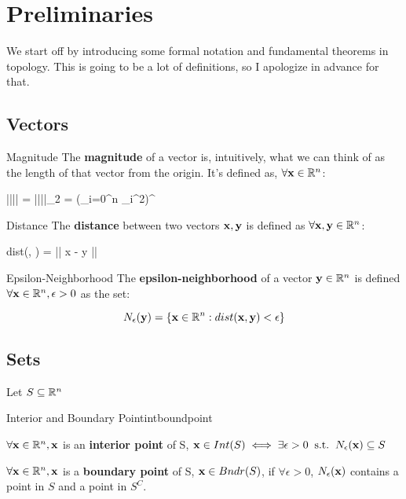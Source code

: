 
% 
% 

\pagebreak
\section{Preliminaries}

We start off by introducing some formal notation and fundamental theorems in topology.
This is going to be a lot of definitions, so I apologize in advance for that.

\subsection{Vectors}

\begin{defn}{Magnitude}{}
	The \textbf{magnitude} of a vector is, intuitively, what we can think of as the length
	of that vector from the origin. It's defined as, $\forall \mathbf{x} \in \mathbb{R}^n$:
\begin{frml}
	||\vx|| = ||\vx||_2 = (\sum_{i=0}^{n} \vx_i^2)^{}
\end{frml}
\end{defn}

\begin{defn}{Distance}{}
	The \textbf{distance} between two vectors $\mathbf{x}, \mathbf{y}$ is defined as $\forall \mathbf{x}, \mathbf{y} \in \mathbb{R}^n$:
	\begin{frml}
		dist(\vx, \vy) = || x - y ||
	\end{frml}
\end{defn}

\begin{defn}{Epsilon-Neighborhood}{}
The \textbf{epsilon-neighborhood} of a vector $\mathbf{y}\in\mathbb{R}^n$ is defined $\forall \mathbf{x}\in\mathbb{R}^n,
\epsilon>0$ as the set: 

$$N_\epsilon (\mathbf{y}) = \{ \mathbf{x} \in \mathbb{R}^n : dist(\mathbf{x}, \mathbf{y}) < \epsilon \}$$
\end{defn}

\subsection{Sets}

Let $S \subseteq \mathbb{R}^n$

\begin{defn}{Interior and Boundary Point}{intboundpoint}

	$\forall \mathbf{x} \in \mathbb{R}^n, \mathbf{x}$ is an \textbf{interior point} of S, 
		$\mathbf{x} \in Int(S) \iff \exists \epsilon > 0 \;\; \text{s.t.} \;\; N_{\epsilon}(\mathbf{x}) \subseteq S$

\bigskip
$\forall \mathbf{x} \in \mathbb{R}^n, \mathbf{x}$ is a \textbf{boundary point} of S, $\mathbf{x} \in Bndr(S)$, if
$\forall \epsilon > 0$, $ N_{\epsilon}(\mathbf{x})$ contains a point in $S$ and a point in $S^C$.
\end{defn}


